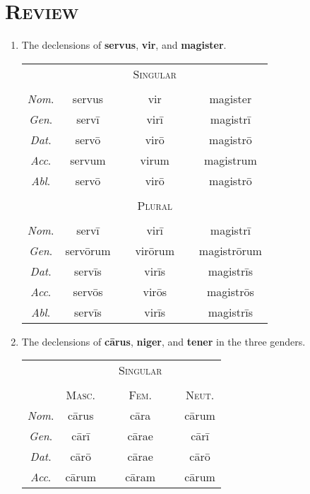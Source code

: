 \documentclass[12pt]{article}
\begin{document}
\section{\textsc{Review}}
\begin{enumerate}[1.]
	\item The declensions of \textbf{servus}, \textbf{vir}, and \textbf{magister}.
	\begin{center}
		\begin{tabular}{ c c c c c c }
		& & & \textsc{Singular} & & \\
		& & & & & \\
		\textit{Nom}. & servus & & vir & & magister \\
		\textit{Gen}. & servī & & virī & & magistrī \\
		\textit{Dat}. & servō & & virō & & magistrō \\
		\textit{Acc}. & servum & & virum & & magistrum \\
		\textit{Abl}. & servō & & virō & & magistrō \\
		& & & & & \\
		& & & \textsc{Plural} & & \\
		& & & & & \\
		\textit{Nom}. & servī & & virī & & magistrī \\
		\textit{Gen}. & servōrum & & virōrum & & magistrōrum \\
		\textit{Dat}. & servīs & & virīs & & magistrīs \\
		\textit{Acc}. & servōs & & virōs & & magistrōs \\
		\textit{Abl}. & servīs & & virīs & & magistrīs \\
		\end{tabular}
	\end{center}
	\item The declensions of \textbf{cārus}, \textbf{niger}, and \textbf{tener} in the three genders.
	\begin{center}
		\begin{tabular}{ c c c c c c }
		& & & \textsc{Singular} & & \\
		& & & & & \\
		& \textsc{Masc}. & & \textsc{Fem}. & & \textsc{Neut}. \\
		\textit{Nom}. & cārus & & cāra & & cārum \\
		\textit{Gen}. & cārī & & cārae & & cārī \\
		\textit{Dat}. & cārō & & cārae & & cārō \\
		\textit{Acc}. & cārum & & cāram & & cārum \\

\end{tabular}
\end{center}
\end{enumerate}
\end{document}
